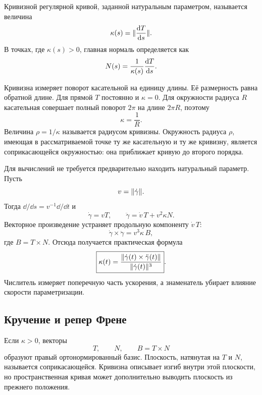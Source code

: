 \begin{definition}
Кривизной регулярной кривой, заданной натуральным параметром, называется величина
\begin{equation}
\label{eq:curve-curvature-definition}
\kappa(s)
=\lVert\frac{\mathop{}\!\mathrm{d} T}{\mathop{}\!\mathrm{d} s}\rVert.
\end{equation}
В точках, где \(\kappa(s)>0\), главная нормаль определяется как
\begin{equation}
\label{eq:principal-normal}
N(s)
=\frac{1}{\kappa(s)}\frac{\mathop{}\!\mathrm{d} T}{\mathop{}\!\mathrm{d} s}.
\end{equation}

\end{definition}

Кривизна измеряет поворот касательной на единицу длины. Её размерность равна обратной длине. Для прямой \(T\) постоянно и \(\kappa=0\). Для окружности радиуса \(R\) касательная совершает полный поворот \(2\pi\) на длине \(2\pi R\), поэтому
\[
\kappa=\frac1R.
\]
Величина \(\rho=1/\kappa\) называется радиусом кривизны. Окружность радиуса \(\rho\), имеющая в рассматриваемой точке ту же касательную и ту же кривизну, является соприкасающейся окружностью: она приближает кривую до второго порядка.

Для вычислений не требуется предварительно находить натуральный параметр. Пусть
\[
v=\lVert\dot\gamma\rVert.
\]
Тогда \(\dd/\dd s=v^{-1}\dd/\dd t\) и
\[
\dot\gamma=vT,
\qquad
\ddot\gamma=\dot v\,T+v^2\kappa N.
\]
Векторное произведение устраняет продольную компоненту \(\dot v\,T\):
\[
\dot\gamma\times\ddot\gamma
=v^3\kappa\,B,
\]
где \(B=T\times N\). Отсюда получается практическая формула
\begin{equation}
\label{eq:curve-curvature-arbitrary-parameter}
\boxed{
\kappa(t)
=
\frac{\lVert\dot\gamma(t)\times\ddot\gamma(t)\rVert}
     {\lVert\dot\gamma(t)\rVert^3}
}.
\end{equation}
Числитель измеряет поперечную часть ускорения, а знаменатель убирает влияние скорости параметризации.

\subsection{Кручение и репер Френе}

Если \(\kappa>0\), векторы
\[
T,
\qquad
N,
\qquad
B=T\times N
\]
образуют правый ортонормированный базис. Плоскость, натянутая на \(T\) и \(N\), называется соприкасающейся. Кривизна описывает изгиб внутри этой плоскости, но пространственная кривая может дополнительно выводить плоскость из прежнего положения.

